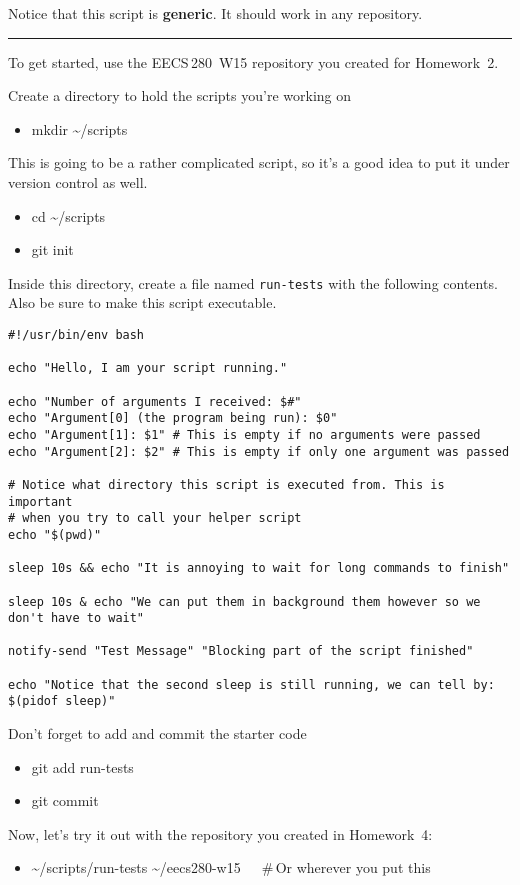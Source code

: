 \documentclass{article}
\begin{document}
\medskip
\noindent
Notice that this script is \textbf{generic}. It should work in any repository.

\bigskip
\hrule
\bigskip

\medskip
\noindent
To get started, use the EECS\,280~W15 repository you created for Homework~2.

\medskip
\noindent
Create a directory to hold the scripts you're working on
\begin{itemize}\tt
  \item mkdir \textasciitilde/scripts
\end{itemize}
This is going to be a rather complicated script, so it's a good
idea to put it under version control as well.
\begin{itemize}\tt
  \item cd \textasciitilde/scripts
  \item git init
\end{itemize}
Inside this directory, create a file named \texttt{run-tests} with the
following contents.  Also be sure to make this script executable.
\begin{lstlisting}
#!/usr/bin/env bash

echo "Hello, I am your script running."

echo "Number of arguments I received: $#"
echo "Argument[0] (the program being run): $0"
echo "Argument[1]: $1" # This is empty if no arguments were passed
echo "Argument[2]: $2" # This is empty if only one argument was passed

# Notice what directory this script is executed from. This is important
# when you try to call your helper script
echo "$(pwd)"

sleep 10s && echo "It is annoying to wait for long commands to finish"

sleep 10s & echo "We can put them in background them however so we don't have to wait"

notify-send "Test Message" "Blocking part of the script finished"

echo "Notice that the second sleep is still running, we can tell by: $(pidof sleep)"
\end{lstlisting}
%
Don't forget to add and commit the starter code
\begin{itemize}\tt
  \item git add run-tests
  \item git commit
\end{itemize}
%
Now, let's try it out with the repository you created in Homework~4:
\begin{itemize}\tt
  \item \textasciitilde/scripts/run-tests \textasciitilde/eecs280-w15~~~\#\,Or wherever you put this
\end{itemize}
\end{document}
